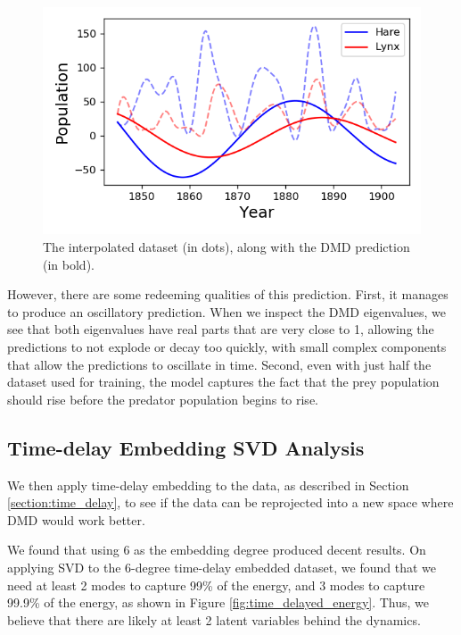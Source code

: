 \documentclass[letterpaper, 10 pt, conference]{ieeeconf}  %
\begin{document}
\begin{figure}[htb] 
\centering
\includegraphics[width=0.97\columnwidth]{images/dmd.png}
\caption{The interpolated dataset (in dots), along with the DMD prediction (in bold).}
\label{fig:dmd}
\end{figure}

However, there are some redeeming qualities of this prediction. First, it manages to produce an oscillatory prediction. When we inspect the DMD eigenvalues, we see that both eigenvalues have real parts that are very close to 1, allowing the predictions to not explode or decay too quickly, with small complex components that allow the predictions to oscillate in time. Second, even with just half the dataset used for training, the model captures the fact that the prey population should rise before the predator population begins to rise.

\subsection{Time-delay Embedding SVD Analysis}
We then apply time-delay embedding to the data, as described in Section \ref{section:time_delay}, to see if the data can be reprojected into a new space where DMD would work better.

We found that using 6 as the embedding degree produced decent results. On applying SVD to the 6-degree time-delay embedded dataset, we found that we need at least 2 modes to capture 99\% of the energy, and 3 modes to capture 99.9\% of the energy, as shown in Figure \ref{fig:time_delayed_energy}. Thus, we believe that there are likely at least 2 latent variables behind the dynamics.
\end{document}
